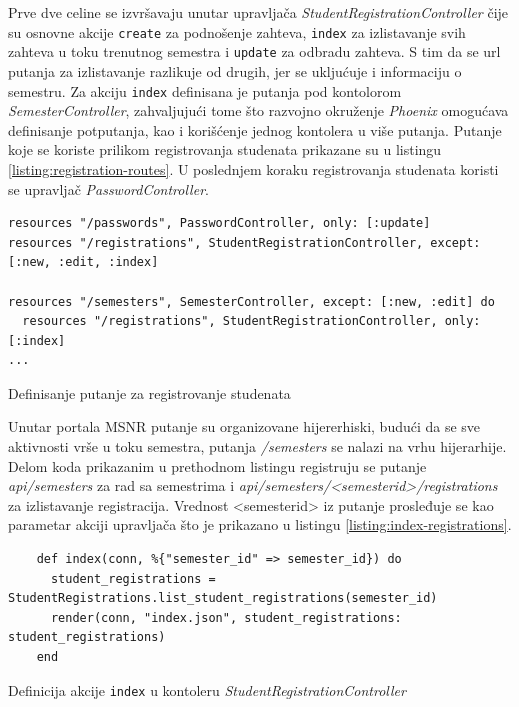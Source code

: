 \documentclass[12pt,oneside]{memoir}
\begin{document}
Prve dve celine se izvršavaju unutar upravljača \emph{StudentRegistrationController} čije su
osnovne akcije \texttt{create} za podnošenje zahteva, \texttt{index} za izlistavanje svih zahteva u toku
trenutnog semestra i \texttt{update} za odbradu zahteva. S tim da se url putanja za izlistavanje razlikuje od drugih,
jer se ukljućuje i informaciju o semestru. Za akciju \texttt{index} definisana je putanja pod kontolorom
\emph{SemesterController}, zahvaljujući tome što razvojno okruženje \emph{Phoenix} omogućava definisanje potputanja, kao i korišćenje jednog kontolera u više putanja.
Putanje koje se koriste prilikom registrovanja studenata prikazane su u listingu \ref{listing:registration-routes}.
U poslednjem koraku registrovanja studenata koristi se upravljač \emph{PasswordController}.
\begin{listing}[h]
\begin{verbatim}
resources "/passwords", PasswordController, only: [:update]
resources "/registrations", StudentRegistrationController, except: [:new, :edit, :index]

resources "/semesters", SemesterController, except: [:new, :edit] do
  resources "/registrations", StudentRegistrationController, only: [:index]
... 
\end{verbatim}
\caption{Definisanje putanje za registrovanje studenata}
\label{listing:registration-routes}
\end{listing}

Unutar portala MSNR putanje su organizovane hijererhiski, budući da se sve aktivnosti vrše u toku semestra,
putanja \emph{/semesters} se nalazi na vrhu hijerarhije. Delom koda prikazanim u prethodnom listingu registruju
se putanje \emph{api/semesters} za rad sa semestrima i \emph{api/semesters/<semester{\textunderscore}id>/registrations}
za izlistavanje registracija. Vrednost <semester{\textunderscore}id> iz putanje prosleđuje se kao parametar akciji
upravljača što je prikazano u listingu \ref{listing:index-registrations}.
\begin{listing}[h]
  \begin{verbatim}
    def index(conn, %{"semester_id" => semester_id}) do
      student_registrations = StudentRegistrations.list_student_registrations(semester_id)
      render(conn, "index.json", student_registrations: student_registrations)
    end
  \end{verbatim}
\caption{Definicija akcije \texttt{index} u kontoleru \emph{StudentRegistrationController}}
\label{listing:index-registrations}
\end{listing}
\end{document}

